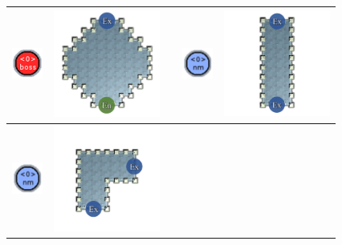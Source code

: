 \begin{longtable}{
    | >{\centering\arraybackslash} m{1.0cm}
    | >{\centering\arraybackslash} m{3.5cm}
    | >{} m{1.0cm}
    | >{\centering\arraybackslash} m{1.0cm}
    | >{\centering\arraybackslash} m{3.5cm} | }
    \\\cline{1-2}\cline{4-5}
  \begin{minipage}{.3\textwidth}\includegraphics[width=10mm]{figures/mission-grammars-alphabet/t-boss.png}\end{minipage}
    & \begin{minipage}{.3\textwidth}\includegraphics[width=35mm]{figures/mission-grammars-ins-rep/instruction-03.png}\end{minipage}
    &
    & \begin{minipage}{.3\textwidth}\includegraphics[width=10mm]{figures/mission-grammars-alphabet/t-normal.png}\end{minipage}
    & \begin{minipage}{.3\textwidth}\includegraphics[width=35mm]{figures/mission-grammars-ins-rep/instruction-04.png}\end{minipage}
    \\\cline{1-2}\cline{4-5}
  \begin{minipage}{.3\textwidth}\includegraphics[width=10mm]{figures/mission-grammars-alphabet/t-normal.png}\end{minipage}
    & \begin{minipage}{.3\textwidth}\includegraphics[width=35mm]{figures/mission-grammars-ins-rep/instruction-05.png}\end{minipage}

\end{longtable}
